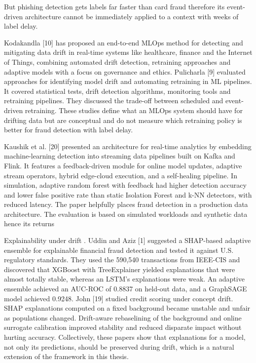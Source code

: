 \documentclass[11pt,letterpaper]{report}
\begin{document}
But phishing detection gets labels far faster than card fraud therefore its event-driven architecture cannot be immediately applied to a context with weeks of label delay.

Kodakandla [10] has proposed an end-to-end MLOps method for detecting and mitigating data drift in real-time systems like healthcare, finance and the Internet of Things, combining automated drift detection, retraining approaches and adaptive models with a focus on governance and ethics. Pulicharla [9] evaluated approaches for identifying model drift and automating retraining in ML pipelines. It covered statistical tests, drift detection algorithms, monitoring tools and retraining pipelines. They discussed the trade-off between scheduled and event-driven retraining. These studies define what an MLOps system should have for drifting data but are conceptual and do not measure which retraining policy is better for fraud detection with label delay.

Kaushik et al. [20] presented an architecture for real-time analytics by embedding machine-learning detection into streaming data pipelines built on Kafka and Flink. It features a feedback-driven module for online model updates, adaptive stream operators, hybrid edge-cloud execution, and a self-healing pipeline. In simulation, adaptive random forest with feedback had higher detection accuracy and lower false positive rate than static Isolation Forest and k-NN detectors, with reduced latency. The paper helpfully places fraud detection in a production data architecture. The evaluation is based on simulated workloads and synthetic data hence its returns

Explainability under drift . Uddin and Aziz [1] suggested a SHAP-based adaptive ensemble for explainable financial fraud detection and tested it against U.S. regulatory standards. They used the 590,540 transactions from IEEE-CIS and discovered that XGBoost with TreeExplainer yielded explanations that were almost totally stable, whereas an LSTM's explanations were weak. An adaptive ensemble achieved an AUC-ROC of 0.8837 on held-out data, and a GraphSAGE model achieved 0.9248. John [19] studied credit scoring under concept drift. SHAP explanations computed on a fixed background became unstable and unfair as populations changed. Drift-aware rebaselining of the background and online surrogate calibration improved stability and reduced disparate impact without hurting accuracy. Collectively, these papers show that explanations for a model, not only its predictions, should be preserved during drift, which is a natural extension of the framework in this thesis.
\end{document}
